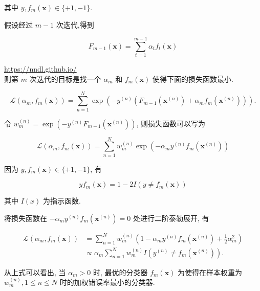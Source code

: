 \documentclass[10pt]{article}
\begin{document}
其中 $y, f_{m}(\boldsymbol{x}) \in\{+1,-1\}$.

假设经过 $m-1$ 次迭代,得到


\begin{equation*}
F_{m-1}(\boldsymbol{x})=\sum_{t=1}^{m-1} \alpha_{t} f_{t}(\boldsymbol{x}) \tag{10.13}
\end{equation*}


\href{https://nndl.github.io/}{https://nndl.github.io/}\\
则第 $m$ 次迭代的目标是找一个 $\alpha_{m}$ 和 $f_{m}(\boldsymbol{x})$ 使得下面的损失函数最小.


\begin{equation*}
\mathcal{L}\left(\alpha_{m}, f_{m}(\boldsymbol{x})\right)=\sum_{n=1}^{N} \exp \left(-y^{(n)}\left(F_{m-1}\left(\boldsymbol{x}^{(n)}\right)+\alpha_{m} f_{m}\left(\boldsymbol{x}^{(n)}\right)\right)\right) . \tag{10.14}
\end{equation*}


令 $w_{m}^{(n)}=\exp \left(-y^{(n)} F_{m-1}\left(\boldsymbol{x}^{(n)}\right)\right)$, 则损失函数可以写为


\begin{equation*}
\mathcal{L}\left(\alpha_{m}, f_{m}(\boldsymbol{x})\right)=\sum_{n=1}^{N} w_{m}^{(n)} \exp \left(-\alpha_{m} y^{(n)} f_{m}\left(\boldsymbol{x}^{(n)}\right)\right) \tag{10.15}
\end{equation*}


因为 $y, f_{m}(\boldsymbol{x}) \in\{+1,-1\}$, 有


\begin{equation*}
y f_{m}(\boldsymbol{x})=1-2 I\left(y \neq f_{m}(\boldsymbol{x})\right) \tag{10.16}
\end{equation*}


其中 $I(x)$ 为指示函数.

将损失函数在 $-\alpha_{m} y^{(n)} f_{m}\left(\boldsymbol{x}^{(n)}\right)=0$ 处进行二阶泰勒展开, 有


\begin{align*}
\mathcal{L}\left(\alpha_{m}, f_{m}(\boldsymbol{x})\right) & =\sum_{n=1}^{N} w_{m}^{(n)}\left(1-\alpha_{m} y^{(n)} f_{m}\left(\boldsymbol{x}^{(n)}\right)+\frac{1}{2} \alpha_{m}^{2}\right)  \tag{10.17}\\
& \propto \alpha_{m} \sum_{n=1}^{N} w_{m}^{(n)} I\left(y^{(n)} \neq f_{m}\left(\boldsymbol{x}^{(n)}\right)\right) . \tag{10.18}
\end{align*}


从上式可以看出, 当 $\alpha_{m}>0$ 时, 最优的分类器 $f_{m}(\boldsymbol{x})$ 为使得在样本权重为 $w_{m}^{(n)}, 1 \leq n \leq N$ 时的加权错误率最小的分类器.
\end{document}
